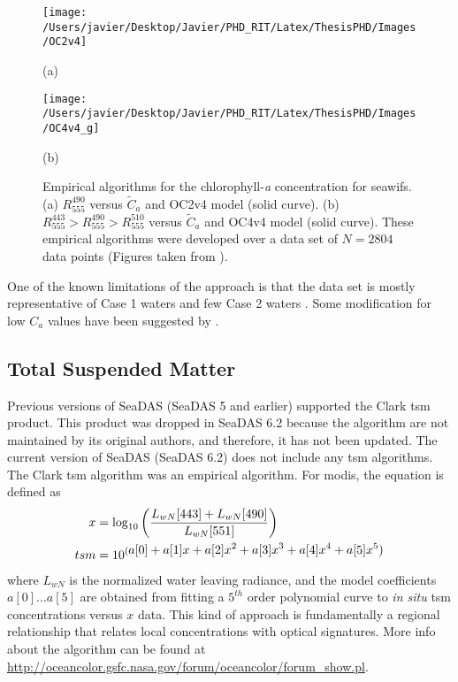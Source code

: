 \begin{figure}[htb]
  \begin{minipage}[c]{0.48\linewidth}
    \centering
      \texttt{[image: /Users/javier/Desktop/Javier/PHD\_RIT/Latex/ThesisPHD/Images/OC2v4]}  
    \centerline{(a)}\medskip
  \end{minipage}
  \hfill
  \begin{minipage}[d]{0.48\linewidth}
    \centering
      \texttt{[image: /Users/javier/Desktop/Javier/PHD\_RIT/Latex/ThesisPHD/Images/OC4v4\_g]}
    \centerline{(b)}\medskip
  \end{minipage}
  \caption{Empirical algorithms for the chlorophyll-{\it a} concentration for \gls{seawifs}. (a) $R_{555}^{490}$ versus $\tilde{C}_a$ and OC2v4 model (solid curve). (b) $R_{555}^{443}>R_{555}^{490}>R_{555}^{510}$ versus $\tilde{C}_a$ and OC4v4 model (solid curve). These empirical algorithms were developed over a data set of $N=2804$ data points (Figures taken from \citet{OReilly2000}). \label{fig:chlemp} } 
\end{figure}

One of the known limitations of the approach is that the data set is mostly representative of Case 1 waters and few Case 2 waters \citep{OReilly2000}. Some modification for low $C_a$ values have been suggested by \citet{Hu:2012fv}.
\subsection{Total Suspended Matter}

Previous versions of SeaDAS (SeaDAS 5 and earlier) supported the Clark \gls{tsm} product. This product was dropped in SeaDAS 6.2 because the algorithm are not maintained by its original authors, and therefore, it has not been updated. The current version of SeaDAS (SeaDAS 6.2) does not include any \gls{tsm} algorithms. The Clark \gls{tsm} algorithm was an empirical algorithm. For \gls{modis}, the equation is defined as
\begin{align}
  x   &= \log_{10}\left(\frac{L_{wN}[443]+L_{wN}[490]}{L_{wN}[551]}\right)\notag \\
  tsm &= 10^{(\displaystyle a[0] + a[1]x + a[2]x^2 + a[3]x^3 + a[4]x^4 + a[5]x^5)}
\end{align}
\noindent where $L_{wN}$ is the normalized water leaving radiance, and the model coefficients $a[0]\dots a[5]$ are obtained from fitting a $5^{th}$ order polynomial curve to {\it in situ} \gls{tsm} concentrations versus $x$ data. This kind of approach is fundamentally a regional relationship that relates local concentrations with optical signatures. More info about the algorithm can be found at \url{http://oceancolor.gsfc.nasa.gov/forum/oceancolor/forum_show.pl}.
